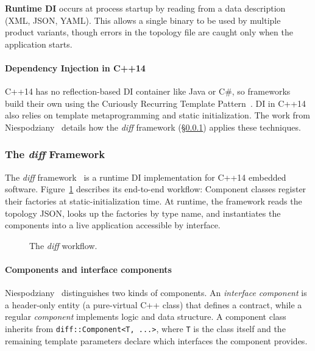 \textbf{Runtime DI} occurs at process startup by reading from a data description (XML, JSON, YAML). This allows a single binary to be used by multiple product variants, though errors in the topology file are caught only when the application starts.

\paragraph{Dependency Injection in C++14}
C++14 has no reflection-based DI container like Java or C\#, so frameworks build their own using the Curiously Recurring Template Pattern~\cite{coplien1995}. DI in C++14~\cite{cpp14standard} also relies on template metaprogramming and static initialization. The work from Niespodziany~\cite{niespodziany2025} details how the \textit{diff} framework (\S\ref{sec:diff-framework}) applies these techniques.

\FloatBarrier

\subsubsection{The \textit{diff} Framework}
\label{sec:diff-framework}

The \textit{diff} framework~\cite{niespodziany2025} is a runtime DI implementation for C++14 embedded software. Figure~\ref{fig:diff-workflow} describes its end-to-end workflow: Component classes register their factories at static-initialization time. At runtime, the framework reads the topology JSON, looks up the factories by type name, and instantiates the components into a live application accessible by interface.
\begin{figure}[ht]
    \centering
    \resizebox{\textwidth}{!}{
        
    }
    \caption[The \textit{diff} workflow.]{The \textit{diff} workflow. }
    \label{fig:diff-workflow}
\end{figure}

\paragraph{Components and interface components}
Niespodziany~\cite{niespodziany2025} distinguishes two kinds of components. An \textit{interface component} is a header-only entity (a pure-virtual C++ class) that defines a contract, while a regular \textit{component} implements logic and data structure. A component class inherits from \texttt{diff::Component<T, ...>}, where \texttt{T} is the class itself and the remaining template parameters declare which interfaces the component provides. 

